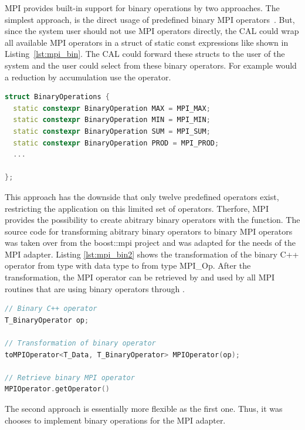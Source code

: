 MPI provides built-in support for binary operations by two
approaches. The simplest approach, is the direct usage of predefined
binary MPI operators~\cite{ref:mpi_bin_op}. But, since the system user
should not use MPI operators directly, the CAL could wrap all
available MPI operators in a struct of static const expressions like
shown in Listing~\ref{lst:mpi_bin}.  The CAL could forward these
structs to the user of the system and the user could select from these
binary operators.  For example would a reduction by accumulation use
the  operator.

\begin{lstlisting}[language=C++, caption={A small collection of binary operators by transformed MPI operations to static constexpression }, label=lst:mpi_bin]
struct BinaryOperations { 
  static constexpr BinaryOperation MAX = MPI_MAX; 
  static constexpr BinaryOperation MIN = MPI_MIN; 
  static constexpr BinaryOperation SUM = MPI_SUM; 
  static constexpr BinaryOperation PROD = MPI_PROD; 
  ...

};
\end{lstlisting}


\noindent This approach has the downside that only twelve predefined
operators exist, restricting the application on this limited set of
operators. Therfore, MPI provides the possibility to create abitrary
binary operators with the  function.  The source
code for transforming abitrary binary operators to binary MPI
operators was taken over from the boost::mpi project
\cite{ref:boost_mpi} and was adapted for the needs of the MPI adapter.
Listing \ref{lst:mpi_bin2} shows the transformation of the binary C++
operator  from type  with data type
 to  from type {MPI\_Op}.  After the
transformation, the MPI operator can be retrieved by and used by all
MPI routines that are using binary operators through
.

\begin{lstlisting}[language=C++, caption={ }, label=lst:mpi_bin2]
// Binary C++ operator
T_BinaryOperator op;  
  
// Transformation of binary operator
toMPIOperator<T_Data, T_BinaryOperator> MPIOperator(op);

// Retrieve binary MPI operator
MPIOperator.getOperator()
\end{lstlisting}

\noindent The second approach is essentially more flexible as the
first one. Thus, it was chooses to implement binary operations for the
MPI adapter.


